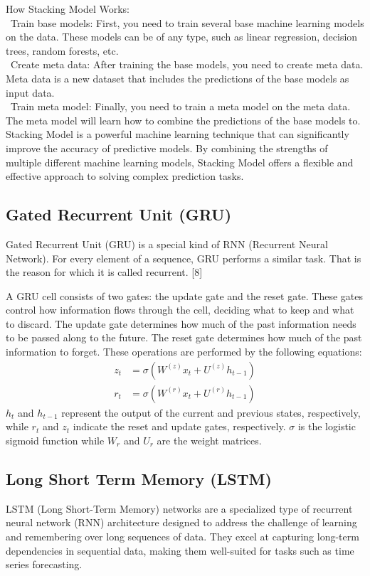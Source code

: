 \documentclass{ieeeojies}
\begin{document}
How Stacking Model Works:
\\
   \indent\textbullet\ Train base models: First, you need to train several base machine learning models on the data. These models can be of any type, such as linear regression, decision trees, random forests, etc. \\
   \indent\textbullet\ Create meta data: After training the base models, you need to create meta data. Meta data is a new dataset that includes the predictions of the base models as input data. \\
   \indent\textbullet\ Train meta model: Finally, you need to train a meta model on the meta data. The meta model will learn how to combine the predictions of the base models to.\\
Stacking Model is a powerful machine learning technique that can significantly improve the accuracy of predictive models. By combining the strengths of multiple different machine learning models, Stacking Model offers a flexible and effective approach to solving complex prediction tasks.

\subsection{Gated Recurrent Unit (GRU)} 
Gated Recurrent Unit (GRU) is a special kind of RNN (Recurrent Neural Network). For every element of a sequence, GRU performs a similar task. That is the reason for which it is called recurrent. [8]

A GRU cell consists of two gates: the update gate and the reset gate. These gates control how information flows through the cell, deciding what to keep and what to discard. The update gate determines how much of the past information needs to be passed along to the future. The reset gate determines how much of the past information to forget. These operations are performed by the following equations:
\begin{align*}
z_t &= \sigma\left( W^{(z)} x_t + U^{(z)} h_{t-1} \right) \\
r_t &= \sigma\left( W^{(r)} x_t + U^{(r)} h_{t-1} \right)
\end{align*}
\(h_t\) and \(h_{t-1}\) represent the output of the current and previous states, respectively, while \(r_t\) and \(z_t\) indicate the reset and update gates, respectively. \(\sigma\) is the logistic sigmoid function while \(W_r\) and \(U_r\) are the weight matrices.


\subsection{Long Short Term Memory (LSTM)}
LSTM (Long Short-Term Memory) networks are a specialized type of recurrent neural network (RNN) architecture designed to address the challenge of learning and remembering over long sequences of data. They excel at capturing long-term dependencies in sequential data, making them well-suited for tasks such as time series forecasting.
\end{document}
